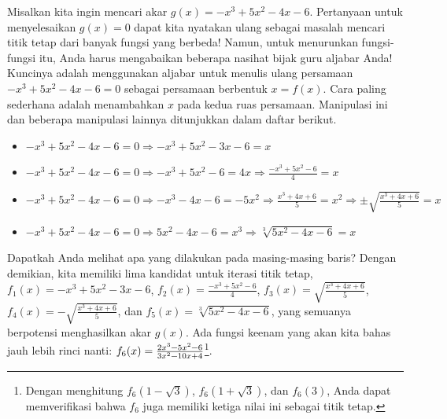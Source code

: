 Misalkan kita ingin mencari akar $g(x)=-x^{3}+5x^{2}-4x-6$. Pertanyaan
untuk menyelesaikan $g(x)=0$ dapat kita nyatakan ulang sebagai masalah
mencari titik tetap dari banyak fungsi yang berbeda! Namun, untuk
menurunkan fungsi-fungsi itu, Anda harus mengabaikan beberapa nasihat
bijak guru aljabar Anda! Kuncinya adalah menggunakan aljabar untuk
menulis ulang persamaan $-x^{3}+5x^{2}-4x-6=0$ sebagai persamaan
berbentuk $x=f(x)$. Cara paling sederhana adalah menambahkan $x$
pada kedua ruas persamaan. Manipulasi ini dan beberapa manipulasi
lainnya ditunjukkan dalam daftar berikut.
\begin{itemize}
\item $-x^{3}+5x^{2}-4x-6=0\Rightarrow-x^{3}+5x^{2}-3x-6=x$
\item $-x^{3}+5x^{2}-4x-6=0\Rightarrow-x^{3}+5x^{2}-6=4x\Rightarrow\frac{-x^{3}+5x^{2}-6}{4}=x$
\item $-x^{3}+5x^{2}-4x-6=0\Rightarrow-x^{3}-4x-6=-5x^{2}\Rightarrow\frac{x^{3}+4x+6}{5}=x^{2}\Rightarrow\pm\sqrt{\frac{x^{3}+4x+6}{5}}=x$
\item $-x^{3}+5x^{2}-4x-6=0\Rightarrow5x^{2}-4x-6=x^{3}\Rightarrow\sqrt[3]{5x^{2}-4x-6}=x$
\end{itemize}
Dapatkah Anda melihat apa yang dilakukan pada masing-masing baris?
Dengan demikian, kita memiliki lima kandidat untuk iterasi titik tetap,
$f_{1}(x)=-x^{3}+5x^{2}-3x-6$, $f_{2}(x)=\frac{-x^{3}+5x^{2}-6}{4}$,
$f_{3}(x)=\sqrt{\frac{x^{3}+4x+6}{5}}$, $f_{4}(x)=-\sqrt{\frac{x^{3}+4x+6}{5}}$,
dan $f_{5}(x)=\sqrt[3]{5x^{2}-4x-6}$, yang semuanya berpotensi menghasilkan
akar $g(x)$. Ada fungsi keenam yang akan kita bahas jauh lebih rinci
nanti: $f_{6}(x)=\frac{2x^{3}\text{\textminus}5x^{2}\text{\textminus}6}{3x^{2}\text{\textminus}10x+4}$\footnote{Dengan menghitung $f_{6}(1-\sqrt{3})$, $f_{6}(1+\sqrt{3})$, dan
$f_{6}(3)$, Anda dapat memverifikasi bahwa $f_{6}$ juga memiliki
ketiga nilai ini sebagai titik tetap.}. 
